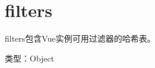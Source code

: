 \begin{lstlisting}[language=JavaScript]

\end{lstlisting}




\begin{lstlisting}[language=JavaScript]

\end{lstlisting}




\begin{lstlisting}[language=JavaScript]

\end{lstlisting}




\begin{lstlisting}[language=JavaScript]

\end{lstlisting}




\begin{lstlisting}[language=JavaScript]

\end{lstlisting}






\section{filters}




filters包含Vue实例可用过滤器的哈希表。


\begin{compactitem}
\item 类型：Object
\end{compactitem}




\begin{lstlisting}[language=JavaScript]

\end{lstlisting}




\begin{lstlisting}[language=JavaScript]

\end{lstlisting}




\begin{lstlisting}[language=JavaScript]

\end{lstlisting}




